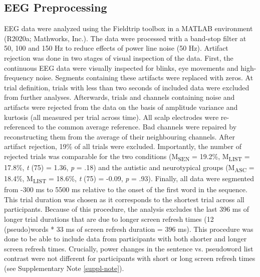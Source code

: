 \subsection{EEG Preprocessing} \label{preprocessing}
EEG data were analyzed using the Fieldtrip toolbox \citep{oostenveld2011} in a MATLAB environment (R2020a; Mathworks, Inc.). The data were processed with a band-stop filter at 50, 100 and 150 Hz to reduce effects of power line noise (50 Hz). Artifact rejection was done in two stages of visual inspection of the data. First, the continuous EEG data were visually inspected for blinks, eye movements and high-frequency noise. Segments containing these artifacts were replaced with zeros. At trial definition, trials with less than two seconds of included data were excluded from further analyses. Afterwards, trials and channels containing noise and artifacts were rejected from the data on the basis of amplitude variance and kurtosis (all measured per trial across time). All scalp electrodes were re-referenced to the common average reference. Bad channels were repaired by reconstructing them from the average of their neighbouring channels. After artifact rejection, 19\% of all trials were excluded. Importantly, the number of rejected trials was comparable for the two conditions (M\textsubscript{SEN} = 19.2\%, M\textsubscript{LIST} = 17.8\%, \textit{t} (75) = 1.36, \textit{p} = .18) and the autistic and neurotypical groups (M\textsubscript{ASC} = 18.4\%, M\textsubscript{LIST} = 18.6\%, \textit{t} (75) = -0.09, \textit{p} = .93). Finally, all data were segmented from -300 ms to 5500 ms relative to the onset of the first word in the sequence. This trial duration was chosen as it corresponds to the shortest trial across all participants. Because of this procedure, the analysis excludes the last 396 ms of longer trial durations that are due to longer screen refresh times (12 (pseudo)words * 33 ms of screen refresh duration = 396 ms). This procedure was done to be able to include data from participants with both shorter and longer screen refresh times. Crucially, power changes in the sentence vs. pseudoword list contrast were not different for participants with short or long screen refresh times (see Supplementary Note \ref{suppl-note}).

